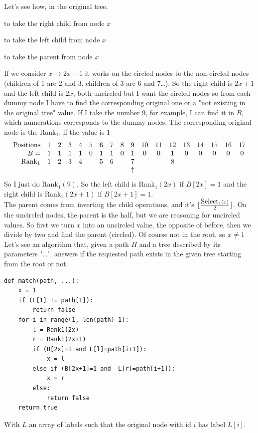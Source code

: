 \documentclass[10pt]{report}
\begin{document}
Let's see how, in the original tree, \begin{list}{}{}
	\item to take the right child from node $x$
	\item to take the left child from node $x$
	\item to take the parent from node $x$
\end{list}
If we consider $x \rightarrow 2x+1$ it works on the circled nodes to the non-circled nodes (children of $1$ are $2$ and $3$, children of $3$ are $6$ and $7$\ldots). So the right child is $2x + 1$ and the left child is $2x$, both uncircled but I want the circled nodes so from each dummy node I have to find the corresponding original one or a "not existing in the original tree" value. If I take the number 9, for example, I can find it in $B$, which numerations corresponds to the dummy nodes. The corresponding original node is the Rank$_1$, if the value is $1$
$$\begin{array}{r c c c c c c c c c c c c c c c c c}
	\hbox{Positions}&1&2&3&4&5&6&7&8&9&10&11&12&13&14&15&16&17\\
	B = &1&1&1&1&0&1&1&0&1&0&0&1&0&0&0&0&0\\
	\hbox{Rank}_1&1&2&3&4& &5&6& & 7 & & & 8\\
	& & & & & & & & &\uparrow
	\end{array}$$
	So I just do Rank$_1(9)$. So the left child is Rank$_1(2x)$ if $B[2x]=1$ and the right child is Rank$_1(2x+1)$ if $B[2x+1]=1$.\\
	The parent comes from inverting the child operations, and it's $\lfloor\frac{\hbox{Select}_1(x)}{2}\rfloor$. On the uncircled nodes, the parent is the half, but we are reasoning for uncircled values. So first we turn $x$ into an uncircled value, the opposite of before, then we divide by two and find the parent (circled). Of course not in the root, so $x\neq 1$\\
Let's see an algorithm that, given a path $\Pi$ and a tree described by its parameters "\ldots", answers if the requested path exists in the given tree starting from the root or not.
\begin{lstlisting}[style=myPython]
def match(path, ...):
	x = 1
	if (L[1] != path[1]):
		return false
	for i in range(1, len(path)-1):
		l = Rank1(2x)
		r = Rank1(2x+1)
		if (B[2x]=1 and L[l]=path[i+1]):
			x = l
		else if (B[2x+1]=1 and  L[r]=path[i+1]):
			x = r
		else:
			return false
	return true
\end{lstlisting}
With $L$ an array of labels such that the original node with id $i$ has label $L[i]$.
\end{document}
